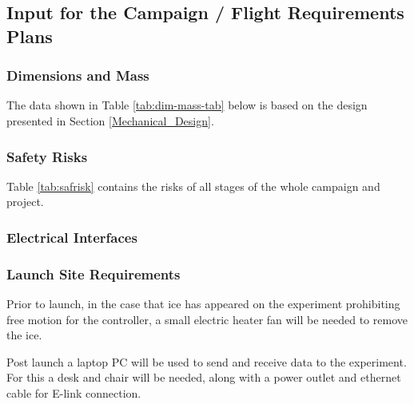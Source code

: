 \subsection{Input for the Campaign / Flight Requirements Plans}


\subsubsection{Dimensions and Mass}
\label{sec:dim-mass}

The data shown in Table \ref{tab:dim-mass-tab} below is based on the design presented in Section \ref{Mechanical_Design}. %



\subsubsection{Safety Risks}
Table \ref{tab:safrisk} contains the risks of all stages of the whole campaign and project.


\subsubsection{Electrical Interfaces}




\subsubsection{Launch Site Requirements}
Prior to launch, in the case that ice has appeared on the experiment prohibiting free motion for the controller, a small electric heater fan will be needed to remove the ice.

Post launch a laptop PC will be used to send and receive data to the experiment. For this a desk and chair will be needed, along with a power outlet and ethernet cable for E-link connection.


